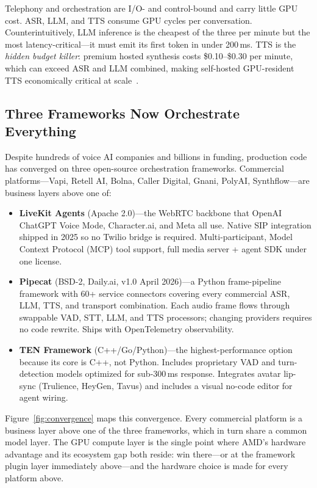 \documentclass[blind]{gtac}
\begin{document}
Telephony and orchestration are I/O- and control-bound and carry little GPU cost. ASR, LLM, and TTS consume GPU cycles per conversation. Counterintuitively, LLM inference is the cheapest of the three per minute but the most latency-critical---it must emit its first token in under 200\,ms. TTS is the \emph{hidden budget killer}: premium hosted synthesis costs \$0.10--\$0.30 per minute, which can exceed ASR and LLM combined, making self-hosted GPU-resident TTS economically critical at scale~\cite{bentoml_tts}.

\subsection{Three Frameworks Now Orchestrate Everything}

Despite hundreds of voice AI companies and billions in funding, production code has converged on three open-source orchestration frameworks. Commercial platforms---Vapi, Retell AI, Bolna, Caller Digital, Gnani, PolyAI, Synthflow---are business layers above one of:

\begin{itemize}
  \item \textbf{LiveKit Agents} (Apache 2.0)---the WebRTC backbone that OpenAI ChatGPT Voice Mode, Character.ai, and Meta all use. Native SIP integration shipped in 2025 so no Twilio bridge is required. Multi-participant, Model Context Protocol (MCP) tool support, full media server + agent SDK under one license.
  \item \textbf{Pipecat} (BSD-2, Daily.ai, v1.0 April 2026)---a Python frame-pipeline framework with 60+ service connectors covering every commercial ASR, LLM, TTS, and transport combination. Each audio frame flows through swappable VAD, STT, LLM, and TTS processors; changing providers requires no code rewrite. Ships with OpenTelemetry observability.
  \item \textbf{TEN Framework} (C++/Go/Python)---the highest-performance option because its core is C++, not Python. Includes proprietary VAD and turn-detection models optimized for sub-300\,ms response. Integrates avatar lip-sync (Trulience, HeyGen, Tavus) and includes a visual no-code editor for agent wiring.
\end{itemize}

Figure~\ref{fig:convergence} maps this convergence. Every commercial platform is a business layer above one of the three frameworks, which in turn share a common model layer. The GPU compute layer is the single point where AMD's hardware advantage and its ecosystem gap both reside: win there---or at the framework plugin layer immediately above---and the hardware choice is made for every platform above.
\end{document}
